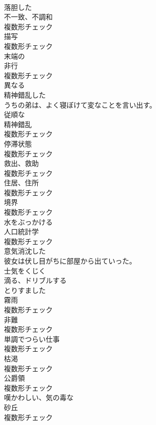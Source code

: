 \documentclass[8pt]{extreport}
\begin{document}
\begin{CJK}{UTF8}{min}
\\	[形容詞]	落胆した	
\\	[名詞]	不一致、不調和	
\\	複数形チェック
\\	[名詞]	描写	
\\	複数形チェック
\\	[形容詞]	末端の	
\\	[名詞]	非行	
\\	複数形チェック
\\	[形容詞]	異なる	
\\	[形容詞]	精神錯乱した	
\\	うちの弟は、よく寝ぼけて変なことを言い出す。	
\\	[形容詞]	従順な	
\\	[名詞]	精神錯乱	
\\	複数形チェック
\\	[名詞]	停滞状態	
\\	複数形チェック
\\	[名詞]	救出、救助	
\\	複数形チェック
\\	[名詞]	住居、住所	
\\	複数形チェック
\\	[名詞]	境界	
\\	複数形チェック
\\	[動詞]	水をぶっかける	
\\	[名詞]	人口統計学	
\\	複数形チェック
\\	[形容詞]	意気消沈した	
\\	彼女は伏し目がちに部屋から出ていった。	
\\	[動詞]	士気をくじく	
\\	[動詞]	滴る、ドリブルする	
\\	[形容詞]	とりすました	
\\	[名詞]	霧雨	
\\	複数形チェック
\\	[名詞]	非難	
\\	複数形チェック
\\	[名詞]	単調でつらい仕事	
\\	複数形チェック
\\	[名詞]	枯渇	
\\	複数形チェック
\\	[名詞]	公爵領	
\\	複数形チェック
\\	[形容詞]	嘆かわしい、気の毒な	
\\	[名詞]	砂丘	
\\	複数形チェック

\end{CJK}
\end{document}

